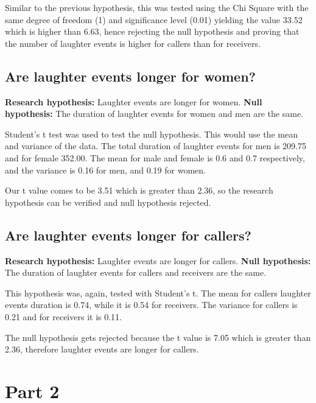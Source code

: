 \documentclass[12pt,a4paper]{article}
\begin{document}
Similar to the previous hypothesis, this was tested using the Chi Square with the same degree of freedom (1) and significance level (0.01) yielding the value 33.52 which is higher than 6.63, hence rejecting the null hypothesis and proving that the number of laughter events is higher for callers than for receivers.

\subsection*{Are laughter events longer for women?}

\textbf{Research hypothesis:} Laughter events are longer for women.\newline
\textbf{Null hypothesis:} The duration of laughter events for women and men are the same.

Student's t test was used to test the null hypothesis. This would use the mean and variance of the data. The total duration of laughter events for men is 209.75 and for female 352.00. The mean for male and female is 0.6 and 0.7 respectively, and the variance is 0.16 for men, and 0.19 for women.

Our t value comes to be 3.51 which is greater than 2.36, so the research hypothesis can be verified and null hypothesis rejected.

\subsection*{Are laughter events longer for callers?}

\textbf{Research hypothesis:} Laughter events are longer for callers.\newline
\textbf{Null hypothesis:} The duration of laughter events for callers and receivers are the same.

This hypothesis was, again, tested with Student's t. The mean for callers laughter events duration is 0.74, while it is 0.54 for receivers. The variance for callers is 0.21 and for receivers it is 0.11.

The null hypothesis gets rejected because the t value is 7.05 which is greater than 2.36, therefore laughter events are longer for callers.

\newpage


\section*{Part 2}
\end{document}
